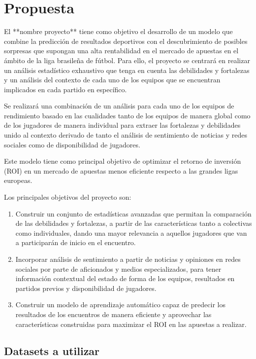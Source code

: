 \section{Propuesta}

El **nombre proyecto** tiene como objetivo el desarrollo de un modelo que combine la predicción de resultados deportivos con el descubrimiento de posibles sorpresas que supongan una alta rentabilidad en el mercado de apuestas en el ámbito de la liga brasileña de fútbol. Para ello, el proyecto se centrará en realizar un análisis estadístico exhaustivo que tenga en cuenta las debilidades y fortalezas y un análisis del contexto de cada uno de los equipos que se encuentran implicados en cada partido en específico.

Se realizará una combinación de un análisis para cada uno de los equipos de rendimiento basado en las cualidades tanto de los equipos de manera global como de los jugadores de manera individual para extraer las fortalezas y debilidades unido al contexto derivado de tanto el análisis de sentimiento de noticias y redes sociales como de disponibilidad de jugadores.

Este modelo tiene como principal objetivo de optimizar el retorno de inversión (ROI) en un mercado de apuestas menos eficiente respecto a las grandes ligas europeas.

Los principales objetivos del proyecto son:

\begin{enumerate}
    \item Construir un conjunto de estadísticas avanzadas que permitan la comparación de las debilidades y fortalezas, a partir de las características tanto a colectivas como individuales, dando una mayor relevancia a aquellos jugadores que van a participarán de inicio en el encuentro.
    \item Incorporar análisis de sentimiento a partir de noticias y opiniones en redes sociales por parte de aficionados y medios especializados, para tener información contextual del estado de forma de los equipos, resultados en partidos previos y disponibilidad de jugadores.
    \item Construir un modelo de aprendizaje automático capaz de predecir los resultados de los encuentros de manera eficiente y aprovechar las características construidas para maximizar el ROI en las apuestas a realizar.
\end{enumerate}

\subsection{Datasets a utilizar}

